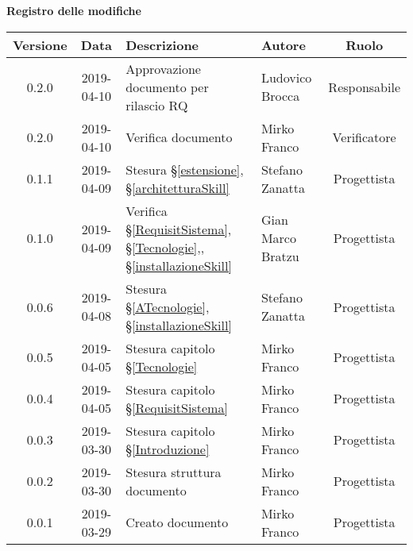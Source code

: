 	\begin{center}
		\textbf{Registro delle modifiche}
	\end{center}
	\begin{center}
		\begin{tabularx}{\textwidth}{|c|c|X|X|c|}
			\hline
			\textbf{Versione} & \textbf{Data} & \textbf{Descrizione} & \textbf{Autore} & \textbf{Ruolo} \\
			\hline
			0.2.0 & 2019-04-10 & Approvazione documento per rilascio RQ & Ludovico Brocca & Responsabile \\		
			\hline
			0.2.0 & 2019-04-10 & Verifica documento & Mirko Franco & Verificatore \\		
			\hline
			0.1.1 & 2019-04-09 & Stesura \S\ref{estensione}, \S\ref{architetturaSkill} & Stefano Zanatta & Progettista \\
			\hline
			0.1.0 & 2019-04-09 & Verifica \S\ref{RequisitSistema}, \S\ref{Tecnologie},, \S\ref{installazioneSkill} & Gian Marco Bratzu & Progettista \\
			\hline
			0.0.6 & 2019-04-08 & Stesura \S\ref{ATecnologie}, \S\ref{installazioneSkill} & Stefano Zanatta & Progettista \\
			\hline
			0.0.5 & 2019-04-05 & Stesura capitolo \S\ref{Tecnologie} & Mirko Franco & Progettista \\
			\hline
			0.0.4 & 2019-04-05 & Stesura capitolo \S\ref{RequisitSistema} & Mirko Franco & Progettista \\
			\hline
			0.0.3 & 2019-03-30 & Stesura capitolo \S\ref{Introduzione} & Mirko Franco & Progettista \\
			\hline
			0.0.2 & 2019-03-30 & Stesura struttura documento & Mirko Franco & Progettista \\
			\hline
			0.0.1 & 2019-03-29 & Creato documento & Mirko Franco & Progettista \\
			\hline
		\end{tabularx}
	\end{center}
\newpage